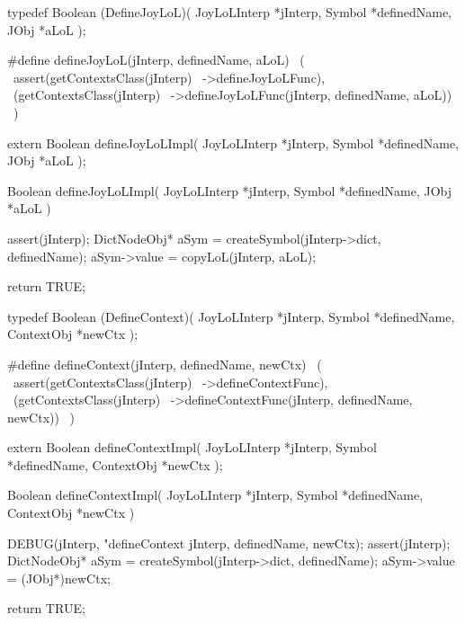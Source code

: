 \startCHeader
typedef Boolean (DefineJoyLoL)(
  JoyLoLInterp *jInterp,
  Symbol       *definedName,
  JObj     *aLoL
);

#define defineJoyLoL(jInterp, definedName, aLoL)      \
  (                                                   \
    assert(getContextsClass(jInterp)                  \
      ->defineJoyLoLFunc),                            \
    (getContextsClass(jInterp)                        \
      ->defineJoyLoLFunc(jInterp, definedName, aLoL)) \
  )
\stopCHeader

\setCHeaderStream{private}
\startCHeader
extern Boolean defineJoyLoLImpl(
  JoyLoLInterp *jInterp,
  Symbol       *definedName,
  JObj     *aLoL
);
\stopCHeader
\setCHeaderStream{public}

\startCCode
Boolean defineJoyLoLImpl(
  JoyLoLInterp *jInterp,
  Symbol       *definedName,
  JObj     *aLoL
) {
  assert(jInterp);
  DictNodeObj* aSym =
    createSymbol(jInterp->dict, definedName);
  aSym->value = copyLoL(jInterp, aLoL);

  return TRUE;
}
\stopCCode

\startCHeader
typedef Boolean (DefineContext)(
  JoyLoLInterp *jInterp,
  Symbol       *definedName,
  ContextObj   *newCtx
);

#define defineContext(jInterp, definedName, newCtx)       \
  (                                                       \
    assert(getContextsClass(jInterp)                      \
      ->defineContextFunc),                               \
    (getContextsClass(jInterp)                            \
      ->defineContextFunc(jInterp, definedName, newCtx))  \
  )
\stopCHeader

\startCHeader
extern Boolean defineContextImpl(
  JoyLoLInterp *jInterp,
  Symbol       *definedName,
  ContextObj   *newCtx
);
\stopCHeader
\setCHeaderStream{public}

\startCCode
Boolean defineContextImpl(
  JoyLoLInterp *jInterp,
  Symbol       *definedName,
  ContextObj   *newCtx
) {
  DEBUG(jInterp, "defineContext %
        jInterp, definedName, newCtx);
  assert(jInterp);
  DictNodeObj* aSym =
    createSymbol(jInterp->dict, definedName);
  aSym->value   = (JObj*)newCtx;

  return TRUE;
}
\stopCCode
